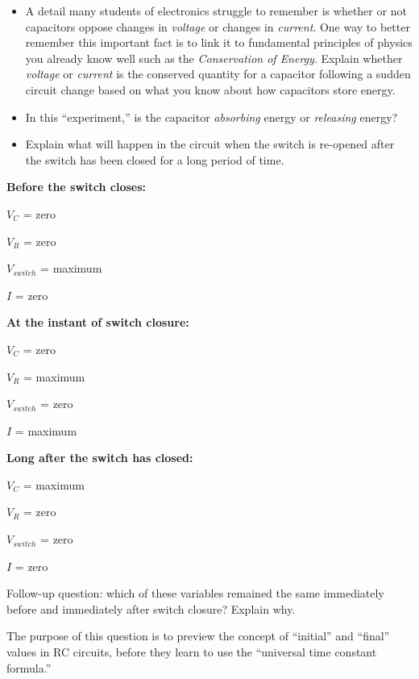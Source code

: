 \begin{itemize}
\item{} A detail many students of electronics struggle to remember is whether or not capacitors oppose changes in {\it voltage} or changes in {\it current}.  One way to better remember this important fact is to link it to fundamental principles of physics you already know well such as the {\it Conservation of Energy}.  Explain whether {\it voltage} or {\it current} is the conserved quantity for a capacitor following a sudden circuit change based on what you know about how capacitors store energy.
\item{} In this ``experiment,'' is the capacitor {\it absorbing} energy or {\it releasing} energy?
\item{} Explain what will happen in the circuit when the switch is re-opened after the switch has been closed for a long period of time.
\end{itemize}







\noindent
{\bf Before the switch closes:}

$V_{C}$ = zero

$V_{R}$ = zero

$V_{switch}$ = maximum

$I$ = zero

\vskip 10pt
\goodbreak

\noindent
{\bf At the instant of switch closure:}

$V_{C}$ = zero

$V_{R}$ = maximum

$V_{switch}$ = zero

$I$ = maximum

\vskip 10pt
\goodbreak

\noindent
{\bf Long after the switch has closed:}

$V_{C}$ = maximum

$V_{R}$ = zero

$V_{switch}$ = zero

$I$ = zero

\vskip 10pt

Follow-up question: which of these variables remained the same immediately before and immediately after switch closure?  Explain why.







The purpose of this question is to preview the concept of ``initial'' and ``final'' values in RC circuits, before they learn to use the ``universal time constant formula.''




